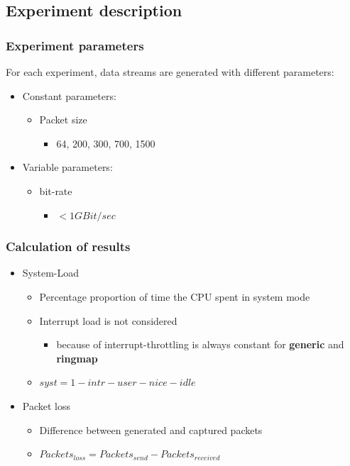 \documentclass{beamer}
\begin{document}
\subsection*{Experiment description}


\begin{frame}
\frametitle{Experiment parameters}
For each experiment, data streams are generated with different parameters:
\begin{itemize}
	\item Constant parameters: 
		\begin{itemize}
			\item Packet size
				\begin{itemize}
					\item 64, 200, 300, 700, 1500
				\end{itemize}
		\end{itemize}
	\item Variable parameters: 
		\begin{itemize}
			\item bit-rate 
				\begin{itemize}
					\item  $ < 1GBit/sec$
				\end{itemize}
		\end{itemize}
\end{itemize}

\end{frame}

\begin{frame}
\frametitle{Calculation of results}
\begin{itemize}
	\item System-Load
		\begin{itemize}
			\item Percentage proportion of time the CPU spent in system mode
			\item Interrupt load is not considered
				\begin{itemize}
					\item because of interrupt-throttling is always constant for \textbf{generic} and \textbf{ringmap}
				\end{itemize}
			\item $syst = 1 - intr - user - nice - idle$\newline
		\end{itemize}
	\item Packet loss
		\begin{itemize}
			\item Difference between generated and captured packets
			\item $Packets_{loss} = Packets_{send} - Packets_{received}$
		\end{itemize}
\end{itemize}
\end{frame}
\end{document}
